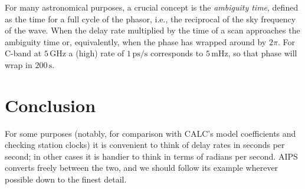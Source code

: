 \documentclass[11pt, twoside, a4paper]{article}
\begin{document}
For many astronomical purposes, a crucial concept is the
\emph{ambiguity time}, defined as the time for a full cycle of the
phasor, i.e., the reciprocal of the sky frequency of the wave. When the
delay rate multiplied by the time of a scan approaches the ambiguity
time or, equivalently, when the phase has wrapped around by $2\pi$.
For C-band at $5\,\mathrm{GHz}$ a (high) rate of
$1\,\mathrm{ps}/\mathrm{s}$ corresponds to $5\,\mathrm{mHz}$, so that
phase will wrap in $200\,\mathrm{s}$.

\section{Conclusion}
For some purposes (notably, for comparison with CALC's model
coefficients and checking station clocks) it is convenient to think of
delay rates in seconds per second; in other cases it is handier to
think in terms of radians per second. AIPS converts freely between the
two, and we should follow its example wherever possible down to the
finest detail.



\end{document}
